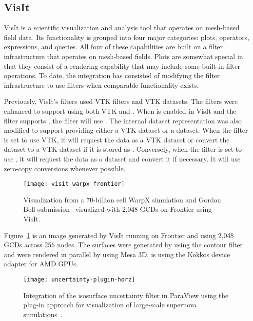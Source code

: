 \subsection{VisIt}

VisIt is a scientific visualization and analysis tool that operates on mesh-based field data.
Its functionality is grouped into four major categories: plots, operators, expressions, and queries.
All four of these capabilities are built on a filter infrastructure that operates on mesh-based fields.
Plots are somewhat special in that they consist of a rendering capability that may include some built-in filter operations.
To date, the \vtkm integration has consisted of modifying the filter infrastructure to use \vtkm filters when comparable \vtkm functionality exists.


Previously, VisIt's filters used VTK filters and VTK datasets.
The filters were enhanced to support using both VTK and \vtkm.
When \vtkm is enabled in VisIt and the filter supports \vtkm, the filter will use \vtkm.
The internal dataset representation was also modified to support providing either a VTK dataset or a \vtkm dataset.
When the filter is set to use VTK, it will request the data as a VTK dataset or convert the dataset to a VTK dataset if it is stored as \vtkm.
Conversely, when the filter is set to use \vtkm, it will request the data as a \vtkm dataset and convert it if necessary.
It will use zero-copy conversions whenever possible.

\begin{figure}[htb]
  \texttt{[image: visit\_warpx\_frontier]}
  \caption{Visualization from a 70-billion cell WarpX simulation and Gordon Bell submission~\citep{FedeliHuebl2022} visualized with 2,048 GCDs on Frontier using VisIt.}
  \label{fig:visit_warpx_frontier}
\end{figure}

Figure~\ref{fig:visit_warpx_frontier} is an image generated by VisIt running on Frontier and using 2,048 GCDs across 256 nodes.
The surfaces were generated by using the \vtkm contour filter and were rendered in parallel by using Mesa 3D.
\vtkm is using the Kokkos device adapter for AMD GPUs.

\begin{figure*}[htb]
  \texttt{[image: uncertainty-plugin-horz]}
  \caption{Integration of the \vtkm isosurface uncertainty filter in ParaView using the plug-in approach for visualization of large-scale supernova simulations~\citep{Sandoval2021}.}
  \label{fig:uncertainty-plugin}
\end{figure*}

